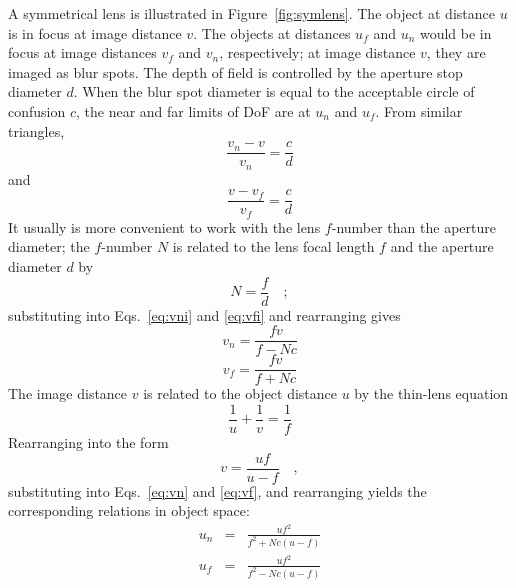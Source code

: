 \documentclass[11pt, oneside]{scrartcl}   	%
\begin{document}
A symmetrical lens is illustrated in Figure~\ref{fig:symlens}. The object at distance $u$ is in focus at image distance $v$. The objects at distances $u_f$ and $u_n$ would be in focus at image distances $v_f$ and $v_n$, respectively; at image distance $v$, they are imaged as blur spots. The depth of field is controlled by the aperture stop diameter $d$. When the blur spot diameter is equal to the acceptable circle of confusion $c$, the near and far limits of DoF are at $u_n$ and $u_f$. From similar triangles,
\begin{equation}
  \frac{v_n - v}{v_n} = \frac c d
  \label{eq:vni}
\end{equation}
and
\begin{equation}
  \frac{v - v_f}{v_f} = \frac c d
  \label{eq:vfi}
\end{equation}
It usually is more convenient to work with the lens $f$-number than the aperture diameter; the
 $f$-number $N$ is related to the lens focal length $f$ and the aperture diameter $d$ by 
 \begin{equation}
   N=\frac f d\quad ;
   \label{eq:N}
\end{equation}
  substituting into Eqs.~\ref{eq:vni} and \ref{eq:vfi} and rearranging gives
\begin{equation}
    v_n=\frac{fv}{f -N c}
  \label{eq:vn}
\end{equation}
\begin{equation}
    v_f=\frac{fv}{f + N\!c}
  \label{eq:vf}
\end{equation}
The image distance $v$ is related to the object distance $u$ by the thin-lens equation
\begin{equation}
   \frac1u+\frac1v=\frac1f
   \label{eq:thinlens}
\end{equation}
Rearranging into the form 
 \begin{equation}
v=\frac{uf}{u-f}\quad,
\end{equation}
substituting into Eqs.~\ref{eq:vn} and \ref{eq:vf}, and rearranging yields the corresponding relations in object space:
\begin{eqnarray}
u_n&=&\frac{uf^2}{f^2 + N\!c(u-f)}\label{eq:un}\\
u_f&=&\frac{uf^2}{f^2 - N\!c(u-f)}\label{eq:uf}
   \label{eq:unf}
\end{eqnarray}
\end{document}
